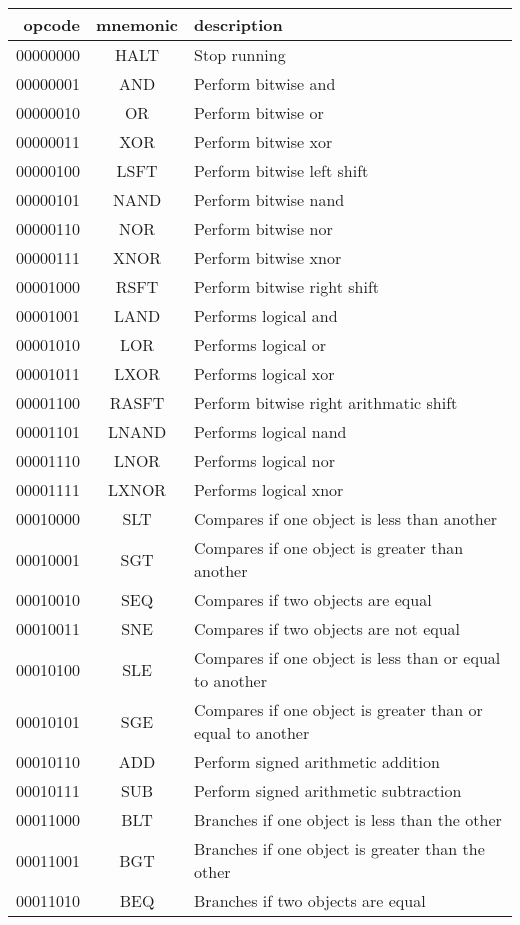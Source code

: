 \documentclass[12pt]{article}
\begin{document}
\vspace{6pt}
\begin{tabular}{| r | c | l |}
\hline
\textbf{opcode} & \textbf{mnemonic} & \textbf{description} \\
\hline
00000000 & HALT & Stop running \\
00000001 & AND & Perform bitwise and \\
00000010 & OR  & Perform bitwise or \\
00000011 & XOR & Perform bitwise xor \\
00000100 & LSFT & Perform bitwise left shift\\
00000101 & NAND & Perform bitwise nand\\
00000110 & NOR & Perform bitwise nor\\
00000111 & XNOR & Perform bitwise xnor\\
00001000 & RSFT & Perform bitwise right shift\\
00001001 & LAND & Performs logical and \\
00001010 & LOR & Performs logical or\\
00001011 & LXOR & Performs logical xor\\
00001100 & RASFT & Perform bitwise right arithmatic shift\\
00001101 & LNAND & Performs logical nand\\
00001110 & LNOR & Performs logical nor\\
00001111 & LXNOR & Performs logical xnor\\
00010000 & SLT & Compares if one object is less than another\\
00010001 & SGT & Compares if one object is greater than another\\
00010010 & SEQ & Compares if two objects are equal\\
00010011 & SNE & Compares if two objects are not equal\\
00010100 & SLE & Compares if one object is less than or equal to another\\
00010101 & SGE & Compares if one object is greater than or equal to another\\
00010110 & ADD & Perform signed arithmetic addition \\
00010111 & SUB & Perform signed arithmetic subtraction \\
00011000 & BLT & Branches if one object is less than the other\\
00011001 & BGT & Branches if one object is greater than the other\\
00011010 & BEQ & Branches if two objects are equal\\

\end{tabular}
\end{document}

